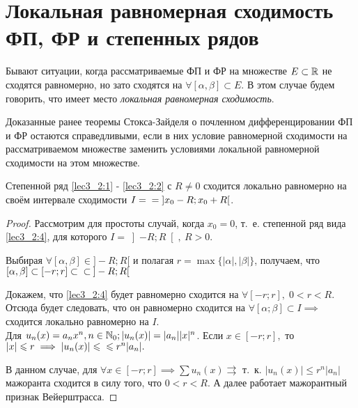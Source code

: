 \documentclass[../../main.tex]{subfiles}
\begin{document}
\section{Локальная равномерная сходимость ФП, ФР и степенных рядов}
Бывают ситуации, когда рассматриваемые ФП и ФР на множестве $E \subset \R$ 
не сходятся равномерно, но зато сходятся на $\forall [\alpha, 
\beta] \subset E$. В этом случае будем говорить, что имеет место 
\emph{локальная равномерная сходимость}.

Доказанные ранее теоремы Стокса-Зайделя о почленном 
дифференцировании ФП и ФР
остаются справедливыми, если в них условие равномерной сходимости 
на рассматриваемом множестве заменить условиями 
локальной равномерной сходимости на этом множестве.

\begin{thm}
	Степенной ряд \eqref{lec3_2:1} - \eqref{lec3_2:2} с $R \ne 0 $ 
	сходится локально равномерно
	на своём интервале сходимости  $I = \\ = \; ]x_0 - R; x_0 + R[$.
\end{thm}

\begin{proof}
	Рассмотрим для простоты случай, когда $x_0 = 0$, т.~е. 
	степенной ряд вида \eqref{lec3_2:4}, для которого $I = \left]-R; R\right[,\ R 
	> 0$.
	
	Выбирая $\forall [\alpha, \beta] \in ]-R; R[$ и полагая 
	$r = \max \{|\alpha|, |\beta|\}$, получаем, что $[\alpha, 
	\beta] \subset [-r; r] \subset \\ \subset \: ]-R; R[$
	
	Докажем, что \eqref{lec3_2:4} будет равномерно сходится на 
	$\forall [-r; r], \; 
	0 < r < R.$ Отсюда будет следовать, что он равномерно сходится на 
	$\forall [\alpha; \beta] \subset I \implies$ сходится 
	локально равномерно на $I$. \\
	Для $u_n(x) = a_n x^n, n \in \N_0; |u_n(x)| = |a_n||x|^n$. 
	Если $x \in [-r; r],$ то $|x| \le r \implies |u_n(x)| \le \\ \le r^n|a_n|.$
	
	В данном случае, для $\forall x \in [-r; r] \implies 
	\sum u_n(x) \rightrightarrows$ т.~к. $|u_n(x)| \le r^n|a_n|$ 
	мажоранта сходится в силу того, что $0 < r < R$.
	А далее работает мажорантный признак Вейерштрасса.
\end{proof}
\end{document}
